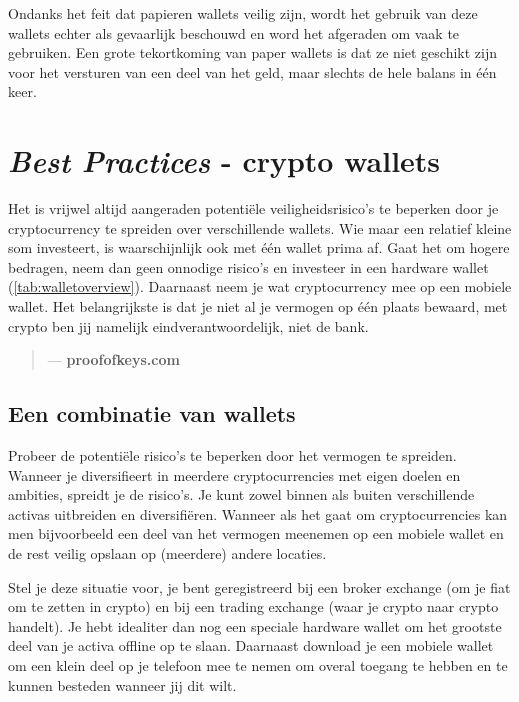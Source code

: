 Ondanks het feit dat papieren wallets veilig zijn, wordt het gebruik van deze wallets echter als gevaarlijk beschouwd en word het afgeraden om vaak te gebruiken. Een grote tekortkoming van paper wallets is dat ze niet geschikt zijn voor het versturen van een deel van het geld, maar slechts de hele balans in {\'e}{\'e}n keer.\medskip



\section{\emph{Best Practices} - crypto wallets}
Het is vrijwel altijd aangeraden potenti{\"e}le veiligheidsrisico's te beperken door je cryptocurrency te spreiden over verschillende wallets. Wie maar een relatief kleine som investeert, is waarschijnlijk ook met {\'e}{\'e}n wallet prima af. Gaat het om hogere bedragen, neem dan geen onnodige risico's en investeer in een hardware wallet (\cref{tab:walletoverview}). Daarnaast neem je wat cryptocurrency mee op een mobiele wallet. Het belangrijkste is dat je niet al je vermogen op {\'e}{\'e}n plaats bewaard, met crypto ben jij namelijk eindverantwoordelijk, niet de bank. \medskip

\begin{quotation}

      \textit{}
      \begin{flushright}
        \small{--- \textbf{proofofkeys.com}}
      \end{flushright}
    
\end{quotation}

\subsection*{Een combinatie van wallets}
Probeer de potenti{\"e}le risico's te beperken door het vermogen te spreiden. Wanneer je diversifieert in meerdere cryptocurrencies met eigen doelen en ambities, spreidt je de risico's. Je kunt zowel binnen als buiten verschillende activas uitbreiden en diversifi{\"e}ren. Wanneer als het gaat om cryptocurrencies kan men bijvoorbeeld een deel van het vermogen meenemen op een mobiele wallet en de rest veilig opslaan op (meerdere) andere locaties.

Stel je deze situatie voor, je bent geregistreerd bij een broker exchange (om je fiat om te zetten in crypto) en bij een trading exchange (waar je crypto naar crypto handelt). Je hebt idealiter dan nog een speciale hardware wallet om het grootste deel van je activa offline op te slaan. Daarnaast download je een mobiele wallet om een klein deel op je telefoon mee te nemen om overal toegang te hebben en te kunnen besteden wanneer jij dit wilt. \medskip

